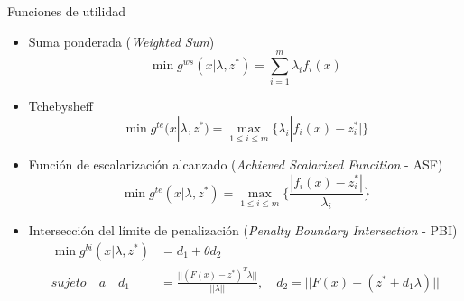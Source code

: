 \documentclass{beamer}
\begin{document}
\begin{frame}{Funciones de utilidad}
\begin{itemize}
\scriptsize
\item Suma ponderada (\textit{Weighted Sum})
\begin{equation*}
\min_{} g^{ws}(x | \lambda, z^*) = \sum_{i=1}^m \lambda_i f_i(x)     
\end{equation*}
\item Tchebysheff 
\begin{equation*}
    \min_{} g^{te}(x | \lambda, z^*) = \max_{1 \leq i \leq m } \{ \lambda_i | f_i(x) - z_i^* | \}
\end{equation*}{}
\item Función de escalarización alcanzado (\textit{Achieved Scalarized Funcition} - ASF)
\begin{equation*}
    \min_{} g^{te}(x | \lambda, z^*) = \max_{1 \leq i \leq m } \{ \frac{| f_i(x) - z_i^* |}{\lambda_i}\}
\end{equation*}{}
\item Intersección del límite de penalización (\textit{Penalty Boundary Intersection} - PBI)
\begin{equation*}
\begin{split}
    \min g^{bi}(x | \lambda, z^*) &= d_1 + \theta d_2    \\
    sujeto \quad  a \quad d_1 &= \frac{|| (F(x) - z^*)^T \lambda  || }{|| \lambda ||}, \quad d_2 = || F(x) - (z^* + d_1 \lambda )||
\end{split}
\end{equation*}
\end{itemize}
\end{frame}
\end{document}
